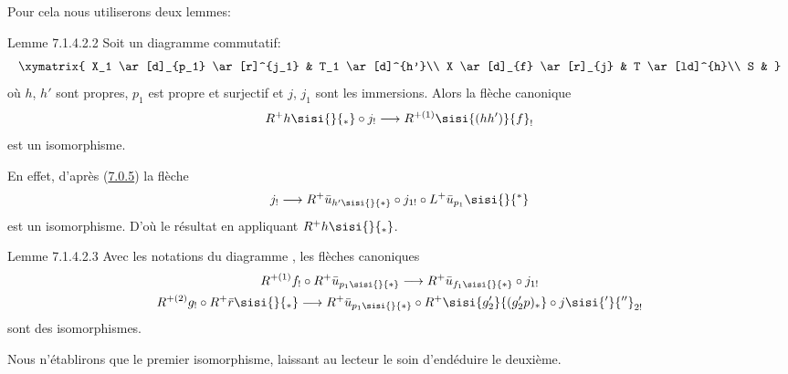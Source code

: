 Pour cela nous utiliserons deux lemmes:

\begin{enonce*}{Lemme 7.1.4.2.2}
Soit un diagramme commutatif:
\[
\xymatrix{
X_1    \ar[d]_{p_1}     \ar[r]^{j_1} & T_1 \ar[d]^{h'}\\
X    \ar[d]_{f}       \ar[r]_{j}           & T \ar[ld]^{h}\\
    S       &
}
\]
où $h$, $h'$ sont propres, $p_{1}$ est propre et surjectif et $j$,
$j_{1}$ sont les immersions. Alors la flèche canonique
\[
R^{+}h\sisi{}{_*}\circ j_{!}\longrightarrow R^{+(1)}\sisi{(hh')}{f}_{!}
\]
est un isomorphisme.
\end{enonce*}

En effet, d'après (\hyperref[XVII.constru7.0.5]{7.0.5}) la flèche
\[
j_{!}\longrightarrow R^{+}\bar{u}_{h'\sisi{}{*}}\circ j_{1!}\circ
L^{+}\bar{u}_{p_{1}}\sisi{}{^*}
\]
est un isomorphisme. D'où le résultat en appliquant $R^{+}h\sisi{}{_*}$.

\begin{enonce*}{Lemme 7.1.4.2.3}
Avec les notations du diagramme \emph{}, les flèches
canoniques
\begin{gather*}
R^{+(1)}f_{!}\circ R^{+}\bar{u}_{p_{1}\sisi{}{*}}\longrightarrow
R^{+}\bar{u}_{f_{1}\sisi{}{*}}\circ j_{1!}\\
R^{+(2)}g_{!}\circ R^{+}\bar{r}\sisi{}{_*}\longrightarrow
R^{+}\bar{u}_{p_{1}\sisi{}{*}}\circ R^{+}\sisi{g'_{2}}{(g_2'p)_*}\circ j\sisi{'}{''}_{2!}
\end{gather*}
sont des isomorphismes.
\end{enonce*}

Nous n'établirons que le premier isomorphisme, laissant au lecteur le
soin d'en\pageoriginale déduire le deuxième.

